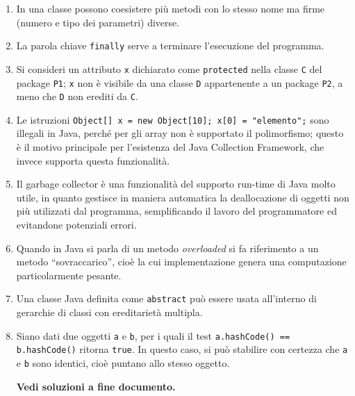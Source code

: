 \documentclass[a4paper,12pt]{article}
\begin{document}
\bigskip

\begin{enumerate}[label=\textbf{\Alph*.}, leftmargin=*, itemsep=0.5em]

\item In una classe possono coesistere più metodi con lo stesso nome ma firme
      (numero e tipo dei parametri) diverse.

\item La parola chiave \texttt{finally} serve a terminare l'esecuzione del programma.

\item Si consideri un attributo \texttt{x} dichiarato come \texttt{protected} nella classe
      \texttt{C} del package \texttt{P1}; \texttt{x} non è visibile da una classe \texttt{D}
      appartenente a un package \texttt{P2}, a meno che \texttt{D} non erediti da \texttt{C}.

\item Le istruzioni \texttt{Object[] x = new Object[10]; x[0] = "elemento";} sono
      illegali in Java, perché per gli array non è supportato il polimorfismo; questo è il
      motivo principale per l'esistenza del Java Collection Framework, che invece supporta
      questa funzionalità.

\item Il garbage collector è una funzionalità del supporto run-time di Java molto utile,
      in quanto gestisce in maniera automatica la deallocazione di oggetti non più utilizzati
      dal programma, semplificando il lavoro del programmatore ed evitandone potenziali errori.

\item Quando in Java si parla di un metodo \emph{overloaded} si fa riferimento a un metodo
      ``sovraccarico'', cioè la cui implementazione genera una computazione particolarmente pesante.

\item Una classe Java definita come \texttt{abstract} può essere usata all'interno di
      gerarchie di classi con ereditarietà multipla.

\item Siano dati due oggetti \texttt{a} e \texttt{b}, per i quali il test
      \texttt{a.hashCode() == b.hashCode()} ritorna \texttt{true}. In questo caso, si può
      stabilire con certezza che \texttt{a} e \texttt{b} sono identici, cioè puntano allo
      stesso oggetto.
      

      
\textbf{Vedi soluzioni a fine documento.}
\end{enumerate}
\end{document}
